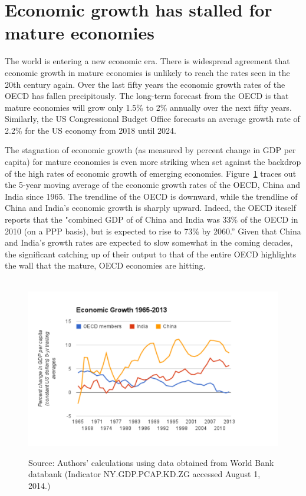 \section{Economic growth  has stalled for mature economies} %
\label{sec:growth_has_slowed}

The world is entering a new economic era. There is widespread agreement that economic growth in mature economies is unlikely to reach the rates seen in the 20th century again.  Over the last fifty years the economic growth rates of the OECD has fallen precipitously. The long-term forecast from the OECD is that mature economies will grow only 1.5\% to 2\% annually over the next fifty years. Similarly, the US Congressional Budget Office forecasts an average growth rate of 2.2\% for the US economy from 2018 until 2024.\cite{OECD2014,CBO2014}

The stagnation of economic growth (as measured by percent change in GDP per capita) for mature economies is even more striking when set against the backdrop of the high rates of economic growth of emerging economies. Figure~\ref{fig:gdppc} traces out the 5-year moving average of the economic growth rates of the OECD, China and India since 1965. The trendline of the OECD is downward, while the trendline of China and India's economic growth is sharply upward.  Indeed, the OECD iteself reports that the "combined GDP of  of China and India was 33\% of the OECD in 2010 (on a PPP basis), but is expected to rise to 73\% by 2060.''\cite[p. 214]{OECD2014} Given that China and India's growth rates are expected to slow somewhat in the coming decades, the significant catching up of their output to that of the entire OECD highlights the wall that the mature, OECD economies are hitting.

\begin{figure}
\centering\
\includegraphics[width=\linewidth]{Part_0/Chapter_Introduction/images/GDPPC1.pdf}
\caption[The traditional model]{Source: Authors' calculations using 
data obtained from World Bank databank (Indicator NY.GDP.PCAP.KD.ZG accessed August 1, 2014.)}
\label{fig:gdppc}
\end{figure}

